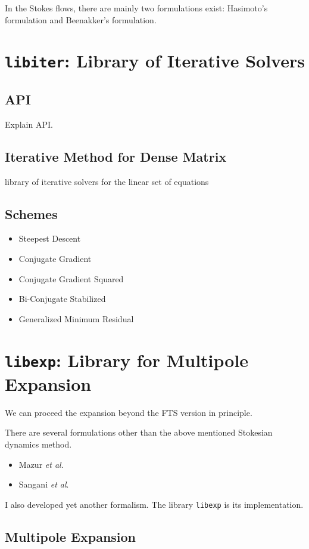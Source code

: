 \documentclass{book}
\begin{document}
In the Stokes flows, there are mainly two formulations exist:
Hasimoto's formulation\cite{Hasimoto1959}
and Beenakker's formulation\cite{Beenakker1986}.




\chapter{{\tt libiter}: Library of Iterative Solvers}
\label{chp:libiter}
\section{API}
Explain API.

\section{Iterative Method for Dense Matrix}
library of iterative solvers for the linear set of equations
\cite{IchikiBrady2001}


\section{Schemes}
\begin{itemize}
\item Steepest Descent
\item Conjugate Gradient
\item Conjugate Gradient Squared
\item Bi-Conjugate Stabilized
\item Generalized Minimum Residual
\end{itemize}



\chapter{{\tt libexp}:
  Library for Multipole Expansion}
\label{chp:libexp}
We can proceed the expansion beyond the FTS version in principle.

There are several formulations other than the above mentioned
Stokesian dynamics method.
\begin{itemize}
\item Mazur {\it et al}.
\item Sangani {\it et al}.
\end{itemize}
I also developed yet another formalism.\cite{Ichiki2002}
The library {\tt libexp} is its implementation.


\section{Multipole Expansion}
\end{document}
